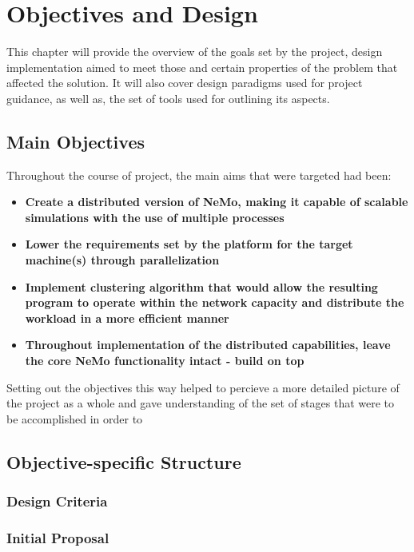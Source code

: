 \chapter{Objectives and Design}

This chapter will provide the overview of the goals set by the project, design implementation aimed to meet those and certain properties of the problem that affected the solution.
It will also cover design paradigms used for project guidance, as well as, the set of tools used for outlining its aspects.

\section{Main Objectives}

Throughout the course of project, the main aims that were targeted had been:

\begin{itemize}
\item {\textbf{Create a distributed version of NeMo, making it capable of scalable simulations with the use of multiple processes}}
\item {\textbf{Lower the requirements set by the platform for the target machine(s) through parallelization}}
\item {\textbf{Implement clustering algorithm that would allow the resulting program to operate within the network capacity and distribute the workload in a more efficient manner}}
\item {\textbf{Throughout implementation of the distributed capabilities, leave the core NeMo functionality intact - build on top}}
\end{itemize}

Setting out the objectives this way helped to percieve a more detailed picture of the project as a whole and gave understanding of the set of stages that were to be accomplished in order to

\section{Objective-specific Structure}

\subsection{Design Criteria}

\subsection{Initial Proposal}

